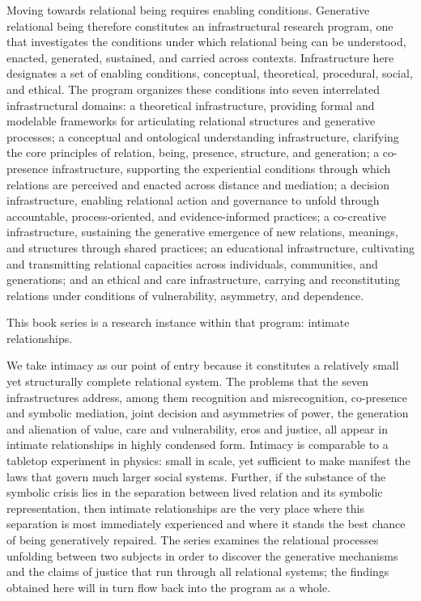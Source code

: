 Moving towards relational being requires enabling conditions. Generative relational being therefore constitutes an infrastructural research program, one that investigates the conditions under which relational being can be understood, enacted, generated, sustained, and carried across contexts. Infrastructure here designates a set of enabling conditions, conceptual, theoretical, procedural, social, and ethical. The program organizes these conditions into seven interrelated infrastructural domains: a theoretical infrastructure, providing formal and modelable frameworks for articulating relational structures and generative processes; a conceptual and ontological understanding infrastructure, clarifying the core principles of relation, being, presence, structure, and generation; a co-presence infrastructure, supporting the experiential conditions through which relations are perceived and enacted across distance and mediation; a decision infrastructure, enabling relational action and governance to unfold through accountable, process-oriented, and evidence-informed practices; a co-creative infrastructure, sustaining the generative emergence of new relations, meanings, and structures through shared practices; an educational infrastructure, cultivating and transmitting relational capacities across individuals, communities, and generations; and an ethical and care infrastructure, carrying and reconstituting relations under conditions of vulnerability, asymmetry, and dependence.

This book series is a research instance within that program: intimate relationships.

We take intimacy as our point of entry because it constitutes a relatively small yet structurally complete relational system. The problems that the seven infrastructures address, among them recognition and misrecognition, co-presence and symbolic mediation, joint decision and asymmetries of power, the generation and alienation of value, care and vulnerability, eros and justice, all appear in intimate relationships in highly condensed form. Intimacy is comparable to a tabletop experiment in physics: small in scale, yet sufficient to make manifest the laws that govern much larger social systems. Further, if the substance of the symbolic crisis lies in the separation between lived relation and its symbolic representation, then intimate relationships are the very place where this separation is most immediately experienced and where it stands the best chance of being generatively repaired. The series examines the relational processes unfolding between two subjects in order to discover the generative mechanisms and the claims of justice that run through all relational systems; the findings obtained here will in turn flow back into the program as a whole.

